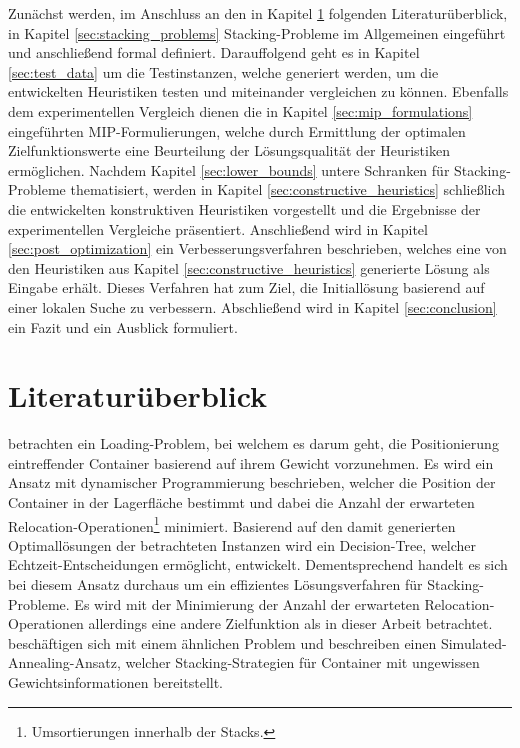 Zunächst werden, im Anschluss an den in Kapitel \ref{sec:literature_review} folgenden Literaturüberblick,
in Kapitel \ref{sec:stacking_problems} Stacking-Probleme im Allgemeinen eingeführt und anschließend formal definiert.
Da­r­auf­fol­gend geht es in Kapitel \ref{sec:test_data} um die Testinstanzen, welche generiert werden,
um die entwickelten Heuristiken testen und miteinander vergleichen zu können.
Ebenfalls dem experimentellen Vergleich dienen die in Kapitel \ref{sec:mip_formulations} eingeführten MIP-Formulierungen, welche durch Ermittlung der optimalen Zielfunktionswerte eine Beurteilung der Lösungsqualität der Heuristiken ermöglichen.
Nachdem Kapitel \ref{sec:lower_bounds} untere Schranken für Stacking-Probleme thematisiert,
werden in Kapitel \ref{sec:constructive_heuristics} schließlich die entwickelten konstruktiven Heuristiken vorgestellt und die Ergebnisse der experimentellen Vergleiche präsentiert. Anschließend wird in Kapitel \ref{sec:post_optimization} ein Verbesserungsverfahren beschrieben, welches eine von den Heuristiken aus Kapitel \ref{sec:constructive_heuristics} generierte Lösung als Eingabe erhält. Dieses Verfahren hat zum Ziel, die Initiallösung basierend auf einer lokalen Suche
zu verbessern. Abschließend wird in Kapitel \ref{sec:conclusion} ein Fazit und ein Ausblick formuliert.

\vfill
\pagebreak

\section{Literaturüberblick}
\label{sec:literature_review}

\citet{Kim2000} betrachten ein Loading-Problem, bei welchem es darum geht, die Positionierung eintreffender
Container basierend auf ihrem Gewicht vorzunehmen. Es wird ein Ansatz mit dynamischer Programmierung beschrieben,
welcher die Position der Container in der Lagerfläche bestimmt und dabei die Anzahl der erwarteten
Relocation-Operationen\footnote{Umsortierungen innerhalb der Stacks.} minimiert.
Basierend auf den damit generierten Optimallösungen der betrachteten Instanzen wird ein Decision-Tree, welcher Echtzeit-Entscheidungen ermöglicht, entwickelt.
Dementsprechend handelt es sich bei diesem Ansatz durchaus um ein effizientes Lösungsverfahren für Stacking-Probleme.
Es wird mit der Minimierung der Anzahl der erwarteten Relocation-Operationen allerdings eine andere Zielfunktion
als in dieser Arbeit betrachtet.\newline
\citet{Kang2006} beschäftigen sich mit einem ähnlichen Problem und beschreiben einen Simulated-Annealing-Ansatz,
welcher Stacking-Strategien für Container mit ungewissen Gewichtsinformationen bereitstellt.

